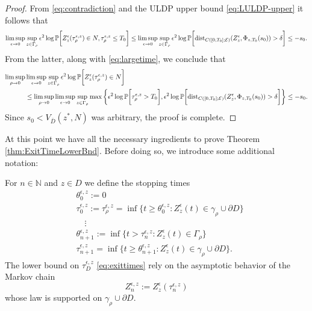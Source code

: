 \documentclass[10pt, reqno]{amsart}
\newcommand{\N}{\mathbb{N}}
\newcommand{\pr}{\mathbb{P}}
\newcommand{\e}{\mathcal{E}}
\theoremstyle{definition}
\numberwithin{lem}{section}
\numberwithin{cor}{section}
\numberwithin{prop}{section}
\numberwithin{thm}{section}
\numberwithin{dfn}{section}
\begin{document}
\begin{proof}
From \eqref{eq:contradiction} and the ULDP upper bound \eqref{eq:LULDP-upper} it follows that
\begin{equation*}\label{eq:smalltime}
    \begin{aligned}
       \limsup_{\epsilon\to 0}\sup_{z\in\Gamma_\rho}\epsilon^2\log\pr\bigg[ Z^\epsilon_z(\tau^{\epsilon,z}_\rho) \in N, \tau^{\epsilon,z}_\rho\leq T_0\bigg]\leq \limsup_{\epsilon\to 0}\sup_{z\in\Gamma_\rho}\epsilon^2\log\pr\bigg[   \textnormal{dist}_{C([0,T_0]; \e)}(Z^{\epsilon}_z, \Phi_{z, T_0}(s_0))>
        \delta      \bigg]\leq -s_0.
    \end{aligned}
\end{equation*}
\noindent From the latter, along with \eqref{eq:largetime}, we conclude that 
\begin{equation*}
\begin{aligned}
    \limsup_{\rho \to 0} &\limsup_{\epsilon \to 0} \sup_{z \in \Gamma_\rho} \epsilon^2\log \pr\bigg[Z^\epsilon_z(\tau^{\epsilon,z}_\rho) \in N\bigg]\\& \leq
         \limsup_{\rho \to 0} \limsup_{\epsilon \to 0} \sup_{z \in \Gamma_\rho}\max\bigg\{   \epsilon^2\log\pr\bigg[\tau^{\epsilon, z}_\rho>T_0\bigg], \epsilon^2\log\pr\bigg[   \textnormal{dist}_{C([0,T_0]; \e)}(Z^{\epsilon}_z, \Phi_{z, T_0}(s_0))>
        \delta      \bigg]  \bigg\}\leq -s_0.
\end{aligned}   
        \end{equation*}
Since $s_0< V_{\bar{D}}(z^*, N)$ was arbitrary, the proof is complete.\end{proof}


 

At this point we have all the necessary ingredients to prove Theorem \ref{thm:ExitTimeLowerBnd}. Before doing so, we introduce some additional notation:

For $n\in\N$ and $ z\in D$ we define the stopping times 
\begin{equation}\label{eq:donutStoppingtimes}
    \begin{aligned}
     &\theta^{\epsilon,z}_0:=0\\&     \tau^{\epsilon,z}_0:=\tau^{\epsilon,z}_\rho=\inf\big\{ t\geq \theta^{\epsilon,z}_0: Z_z^{\epsilon}(t)\in\gamma_\rho\cup \partial D\big\}\\&
        \quad\vdots
         \\&
        \theta^{\epsilon,z}_{n+1}:=\inf\big\{ t>\tau^{\epsilon,z}_n: Z_z^{\epsilon}(t)\in\Gamma_\rho\big\}\\&     \tau^{\epsilon,z}_{n+1}=\inf\big\{ t\geq \theta^{\epsilon,z}_{n+1}: Z_z^{\epsilon}(t)\in\gamma_\rho\cup \partial D\big\}.    
    \end{aligned}
\end{equation}
The lower bound on $\tau_D^{\epsilon, z}$ \eqref{eq:exittimes} rely on the asymptotic behavior of the Markov chain \begin{equation}\label{eq:Markovchain}
Z^{\epsilon,z}_n:=Z^{\epsilon}_z(\tau^{\epsilon,z}_{n})
\end{equation}
whose law is supported on $\gamma_\rho\cup \partial D.$
\end{document}

